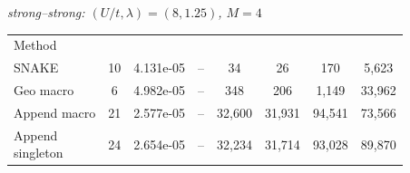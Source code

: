 \documentclass[
  reprint,
  amsmath,
  amssymb,
  aps,
  pra,
  nofootinbib,
  superscriptaddress,
  floatfix
]{revtex4-2}
\newcommand{\twq}{\mathrm{2Q}}
\newcommand{\metrichead}[1]{\makebox[0.061\textwidth][c]{#1}}
\begin{document}
\noindent\begin{minipage}{\columnwidth}
\begin{center}
\scriptsize
\setlength{\tabcolsep}{0.70pt}
\renewcommand{\arraystretch}{1.0}
\textit{strong--strong: $(U/t,\lambda)=(8,1.25)$, \(M=4\)}
\par\smallskip
\begin{ruledtabular}
\begin{tabular}{p{}ccccccc}
Method & \metrichead{$k_{\rm pl}$} & \metrichead{$|\Delta E|$} & \metrichead{$1-F$} & \metrichead{$N_{\twq}$} & \metrichead{$D_{\twq}$} & \metrichead{$D_c$} & \metrichead{$S$}\\
\colrule
SNAKE & 10 & 4.131e-05 & -- & 34 & 26 & 170 & 5,623 \\
Geo macro & 6 & 4.982e-05 & -- & 348 & 206 & 1,149 & 33,962 \\
Append macro & 21 & 2.577e-05 & -- & 32,600 & 31,931 & 94,541 & 73,566 \\
\shortstack[l]{Append\\singleton} & 24 & 2.654e-05 & -- & 32,234 & 31,714 & 93,028 & 89,870 \\
\end{tabular}
\end{ruledtabular}
\end{center}
\end{minipage}
\par\addvspace{0.45ex}
\par\addvspace{1.0ex}
\clearpage
\end{document}
